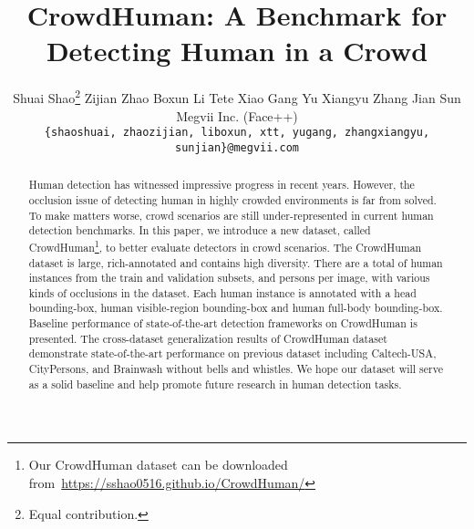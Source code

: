 \documentclass[10pt,twocolumn,letterpaper]{article}
\begin{document}
\title{CrowdHuman: A Benchmark for Detecting Human in a Crowd} 


\author{
    Shuai Shao\thanks{Equal contribution.}
    \hspace{10pt}
    Zijian Zhao\footnotemark[1]
    \hspace{10pt}
    Boxun Li
    \hspace{10pt}
    Tete Xiao
    \hspace{10pt}
    Gang Yu
    \hspace{10pt}
    Xiangyu Zhang
    \hspace{10pt}
    Jian Sun\\
    Megvii Inc. (Face++)\\
{\tt\small \{shaoshuai, zhaozijian, liboxun, xtt, yugang, zhangxiangyu, sunjian\}@megvii.com}
}

\maketitle

\begin{abstract}
Human detection has witnessed impressive progress in recent years. However, the occlusion issue of detecting human in highly crowded environments is far from solved. To make matters worse, crowd scenarios are still under-represented in current human detection benchmarks. In this paper, we introduce a new dataset, called CrowdHuman\footnote{Our CrowdHuman dataset can be downloaded from~\url{https://sshao0516.github.io/CrowdHuman/}}, to better evaluate detectors in crowd scenarios. The CrowdHuman dataset is large, rich-annotated and contains high diversity. There are a total of  human instances from the train and validation subsets, and  persons per image, with various kinds of occlusions in the dataset. Each human instance is annotated with a head bounding-box, human visible-region bounding-box and human full-body bounding-box. Baseline performance of state-of-the-art detection frameworks on CrowdHuman is presented. The cross-dataset generalization results of CrowdHuman dataset demonstrate state-of-the-art performance on previous dataset including Caltech-USA, CityPersons, and Brainwash without bells and whistles. We hope our dataset will serve as a solid baseline and help promote future research in human detection tasks.
\end{abstract}
\end{document}
